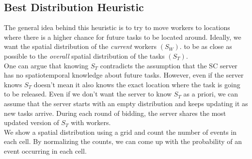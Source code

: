 \begin{itemize}


\end{itemize}

\subsection{Best Distribution Heuristic}

The general idea behind this heuristic is to try to move workers to locations where there is a higher chance for future tasks to be located around. Ideally, we want the spatial distribution of the \textit{current} workers $(S_W)$. to be as close as possible to the \textit{overall} spatial distribution of the tasks $(S_T)$.\\
One can argue that knowing $S_T$ contradicts the assumption that the SC server has no spatiotemporal knowledge about future tasks. However, even if the server knows $S_T$ doesn't mean it also knows the exact location where the task is going to be released. Even if we don't want the server to know $S_T$ as a priori, we can assume that the server starts with an empty distribution and keeps updating it as new tasks arrive. During each round of bidding, the server shares the most updated version of $S_T$ with workers.\\
We show a spatial distribution using a grid and count the number of events in each cell. By normalizing the counts, we can come up with the probability of an event occurring in each cell.\\